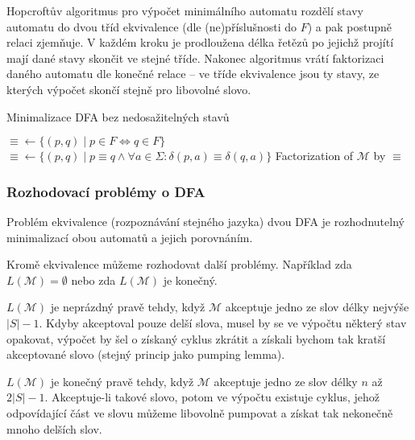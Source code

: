Hopcroftův algoritmus pro výpočet minimálního automatu rozdělí stavy
automatu do dvou tříd ekvivalence (dle (ne)příslušnosti do $F$) a pak
postupně relaci zjemňuje. V každém kroku je prodloužena délka řetězů po
jejichž projítí mají dané stavy skončit ve stejné tříde.  Nakonec
algoritmus vrátí faktorizaci daného automatu dle konečné relace --
ve tříde ekvivalence jsou ty stavy, ze kterých výpočet
skončí stejně pro libovolné slovo.

\begin{algorithm}
\caption{Minimalizace DFA bez nedosažitelných stavů}
\begin{algorithmic}[1]
    \State ${\equiv} \gets \{(p,q) \mid p \in F \iff q \in F \}$
        \State ${\equiv} \gets
            \{ (p,q) \mid p \equiv q \land \forall a \in \Sigma :
            \delta(p,a) \equiv \delta(q,a) \}$
    \EndWhile
    \State \Return Factorization of $\mathcal{M}$ by ${\equiv}$
\EndFunction
\end{algorithmic}
\end{algorithm}

\begin{example}
\end{example}

\subsubsection{Rozhodovací problémy o DFA}

Problém ekvivalence (rozpoznávání stejného jazyka) dvou DFA je
rozhodnutelný minimalizací obou automatů a jejich porovnáním.

Kromě ekvivalence můžeme rozhodovat další problémy. Například zda
\linebreak $L(\mathcal{M}) = \emptyset$ nebo zda $L(\mathcal{M})$ je
konečný.

$L(\mathcal{M})$ je neprázdný pravě tehdy, když $\mathcal{M}$
akceptuje jedno ze slov délky nejvýše $\lvert S \rvert -1$.
Kdyby akceptoval pouze delší slova, musel by se ve výpočtu některý stav
opakovat, výpočet by šel o získaný cyklus zkrátit a získali bychom tak
kratší akceptované slovo (stejný princip jako pumping lemma).

$L(\mathcal{M})$ je konečný pravě tehdy, když $\mathcal{M}$
akceptuje jedno ze slov délky $n$ až $2 \lvert S \rvert - 1$.
Akceptuje-li takové slovo, potom ve výpočtu existuje cyklus, jehož
odpovídající část ve slovu můžeme libovolně pumpovat a získat tak
nekonečně mnoho delších slov.

